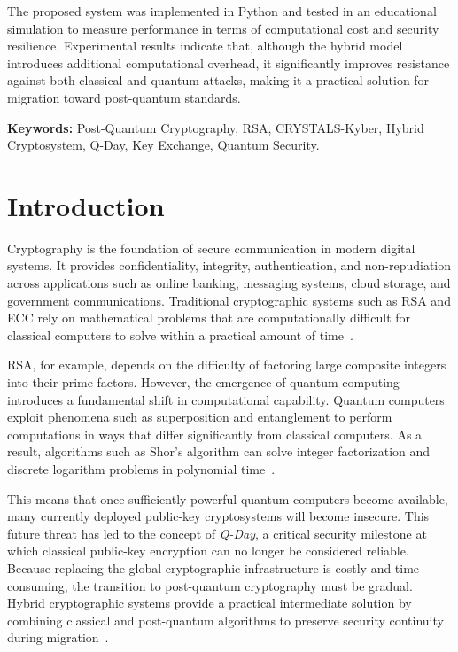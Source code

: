 \documentclass[12pt,a4paper]{article}
\begin{document}
The proposed system was implemented in Python and tested in an educational simulation to measure performance in terms of computational cost and security resilience. Experimental results indicate that, although the hybrid model introduces additional computational overhead, it significantly improves resistance against both classical and quantum attacks, making it a practical solution for migration toward post-quantum standards.

\textbf{Keywords:} Post-Quantum Cryptography, RSA, CRYSTALS-Kyber, Hybrid Cryptosystem, Q-Day, Key Exchange, Quantum Security.

\newpage
\section{Introduction}

Cryptography is the foundation of secure communication in modern digital systems. It provides confidentiality, integrity, authentication, and non-repudiation across applications such as online banking, messaging systems, cloud storage, and government communications. Traditional cryptographic systems such as RSA and ECC rely on mathematical problems that are computationally difficult for classical computers to solve within a practical amount of time~\cite{rsa1978}.

RSA, for example, depends on the difficulty of factoring large composite integers into their prime factors. However, the emergence of quantum computing introduces a fundamental shift in computational capability. Quantum computers exploit phenomena such as superposition and entanglement to perform computations in ways that differ significantly from classical computers. As a result, algorithms such as Shor's algorithm can solve integer factorization and discrete logarithm problems in polynomial time~\cite{shor1994,shor1997}.

This means that once sufficiently powerful quantum computers become available, many currently deployed public-key cryptosystems will become insecure. This future threat has led to the concept of \emph{Q-Day}, a critical security milestone at which classical public-key encryption can no longer be considered reliable. Because replacing the global cryptographic infrastructure is costly and time-consuming, the transition to post-quantum cryptography must be gradual. Hybrid cryptographic systems provide a practical intermediate solution by combining classical and post-quantum algorithms to preserve security continuity during migration~\cite{nistir8105,stebila2017}.
\end{document}
